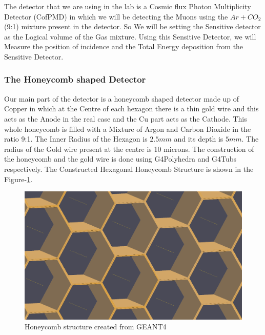 \documentclass{article}
\begin{document}
\begin{multicols}{2}
The detector that we are using in the lab is a Cosmic flux Photon Multiplicity Detector (CofPMD) in which we will be detecting
the Muons using the $Ar+CO_2$ (9:1) mixture present in the detector. So We will be setting the Sensitive detector as the Logical volume
of the Gas mixture. Using this Sensitive Detector, we will Measure the position of incidence and the Total  Energy deposition
from the Sensitive Detector.

\subsubsection{The Honeycomb shaped Detector}

Our main part of the detector is a honeycomb shaped detector made up of Copper in which at the Centre of each
hexagon there is a thin gold wire and this acts as the Anode in the real case and the Cu part acts as the Cathode. This whole
honeycomb is filled with a Mixture of Argon and Carbon Dioxide in the ratio 9:1. The Inner Radius of the Hexagon is $2.5mm$
and its depth is $5mm$. The radius of the Gold wire present at the centre is 10 microns. The construction of the honeycomb
and the gold wire is done using G4Polyhedra and G4Tubs respectively. The Constructed Hexagonal Honeycomb Structure is 
shown in the Figure-\ref{honeycomb}.

\begin{figure}[H]
    \centering	
     \includegraphics[width=\columnwidth]{honeycomb.png}
     \caption{Honeycomb structure created from GEANT4}
     \label{honeycomb}
\end{figure}


\end{multicols}
\end{document}
